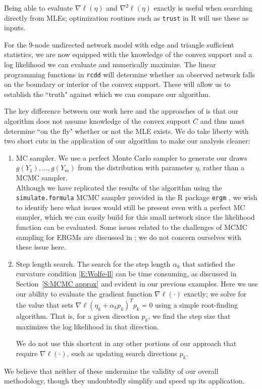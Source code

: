 Being able to evaluate $\nabla \ell(\eta)$ and 
$\nabla^2 \ell(\eta)$ exactly is useful when searching directly from MLEs;
optimization routines such as \texttt{trust} \citep{trust:R} in R will use these
as inputs.  

For the 9-node undirected network model with edge and triangle sufficient statistics,
we are now equipped with the knowledge of the convex support and a log likelihood we 
can evaluate and numerically maximize.  The linear programming functions in 
\texttt{rcdd} will determine whether an observed network falls on the boundary 
or interior of the convex support.  These will allow us to establish the ``truth" 
against which we can compare our algorithm.

The key difference between our work here and the approaches of 
\citep{Handcock:degeneracy,Rinaldo:2009} is that our algorithm does not assume
knowledge of the convex support $C$ and thus must determine ``on the fly" whether
or not the MLE exists.  
We do take liberty with two short cuts in the application of our algorithm to make 
our analysis cleaner:
\begin{enumerate}
\item MC sampler.  We use a perfect Monte Carlo sampler to generate our draws \\
$g(Y_1), \ldots, g(Y_m)$ from the distribution with parameter $\eta$, rather than a 
MCMC sampler. \\
 Although we have replicated the results of the algorithm using the 
 \texttt{simulate.formula} MCMC sampler provided in the R package \texttt{ergm} 
 \citep{ergm:R}, we wish to identify here what 
issues would still be present even with a perfect MC sampler, which we can easily build for 
this small network since the likelihood function can be evaluated.  Some issues 
related to the challenges of MCMC sampling for ERGMs are discussed in 
\citep{ergm,Morris:2008}; we do not concern ourselves with these issue here.

\item Step length search.  The search for the step length $\alpha_k$ that satisfied the 
curvature condition \eqref{E:Wolfe-ll} can be time consuming, as discussed in
Section~\ref{S:MCMC approx} and evident in our previous examples.
Here we use our ability to evaluate the gradient function $\nabla \ell(\cdot)$ exactly;  
we solve for the value that sets $\nabla \ell( \eta_k + \alpha_k p_k)^T p_k = 0$ 
using a simple root-finding algorithm.  That is, for a given 
direction $p_k$, we find the step size that maximizes the log likelihood in that 
direction.

We do not use this shortcut in any other portions of our approach that 
require $\nabla \ell(\cdot)$, 
such as updating search directions $p_k$.

\end{enumerate}
We believe that neither of these undermine the validity of our overall methodology, 
though they undoubtedly simplify and speed up its application.


